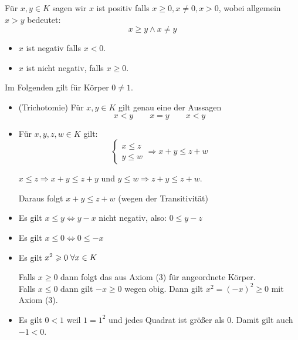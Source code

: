 \documentclass[main.tex]{subfiles}
\begin{document}
\begin{Definition}[Positivität]
  Für $x,y \in K$ sagen wir $x$ ist positiv falls $x \geq 0, x\neq 0, x>0$, wobei allgemein $x > y$ bedeutet:
  $$x \geq y \land x \neq y$$
  \begin{itemize}
    \item $x$ ist negativ falls $x<0$.
    \item $x$ ist nicht negativ, falls $x \geq 0$.
  \end{itemize}
\end{Definition}

\begin{Bemerkung}[Annahme]
  Im Folgenden gilt für Körper $0 \neq 1$.
\end{Bemerkung}

\begin{Theorem}
  \begin{itemize}
    \item (Trichotomie) Für $x,y \in K$ gilt genau eine der Aussagen
    $$ x < y \qquad x = y \qquad x < y$$
    \item Für $x,y,z,w \in K$ gilt:
    $$\left\{ \begin{array}{c}
      x\leq z \\
      y\leq w
    \end{array} \Rightarrow x+y \leq z+w \right.$$
    \begin{Beweis}
      $x\leq z \Rightarrow x+y \leq z+y$ und $y \leq w \Rightarrow z+y \leq z+w$.

      Daraus folgt $x+y \leq z+w$ (wegen der Transitivität)
    \end{Beweis}
    \item Es gilt $x\leq y \Leftrightarrow y-x$ nicht negativ, also: $0 \leq y-z$
    \item Es gilt $x \leq 0 \Leftrightarrow 0 \leq -x$
    \item Es gilt $x^2 \geqslant 0 \;\forall x\in K$
    \begin{Beweis}
      Falls $x\geq 0$ dann folgt das aus Axiom (3) für angeordnete Körper.\\
      Falls $x\leq 0$ dann gilt $-x \geq 0$ wegen obig. Dann gilt $x^2 = (-x)^2 \geq 0$ mit Axiom (3).
    \end{Beweis}
    \item Es gilt $0 < 1$ weil $1 = 1^2$ und jedes Quadrat ist größer als 0. Damit gilt auch $-1 < 0$.
  \end{itemize}
\end{Theorem}
\end{document}
